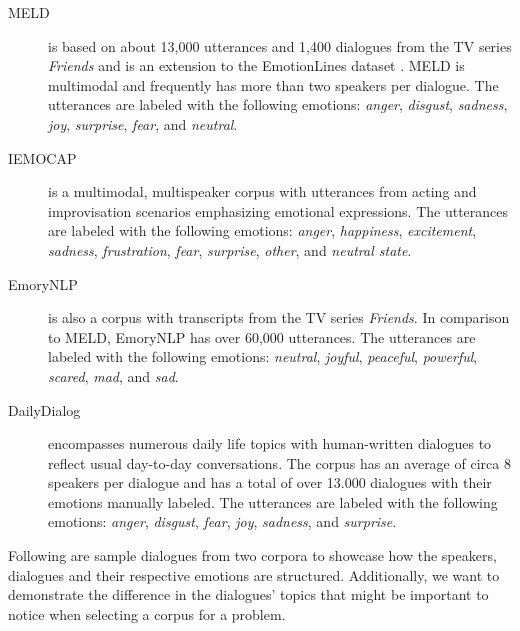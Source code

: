 \documentclass[nofilelist]{cslthse-msc}
\begin{document}
\begin{description}
    \item[MELD] \citep{poria2019meld} is based on about 13,000 utterances and 1,400 dialogues from the TV series \textit{Friends} and is an extension to the EmotionLines dataset \citep{chen2018emotionlines}. MELD is multimodal and  frequently has more than two speakers per dialogue. The utterances are labeled with the following emotions: \textit{anger}, \textit{disgust}, \textit{sadness}, \textit{joy}, \textit{surprise}, \textit{fear}, and \textit{neutral}.

    \item[IEMOCAP] \citep{busso2008iemocap} is a multimodal, multispeaker corpus with utterances from acting and improvisation scenarios emphasizing emotional expressions. The utterances are labeled with the following emotions: \textit{anger}, \textit{happiness}, \textit{excitement}, \textit{sadness}, \textit{frustration}, \textit{fear}, \textit{surprise}, \textit{other}, and \textit{neutral state}.
    
    \item[EmoryNLP] \citep{zahiri2017emoryNLP} is also a corpus with transcripts from the TV series \textit{Friends}. In comparison to MELD, EmoryNLP has over 60,000 utterances. The utterances are labeled with the following emotions: \textit{neutral}, \textit{joyful}, \textit{peaceful}, \textit{powerful}, \textit{scared}, \textit{mad}, and \textit{sad}.
    
    \item[DailyDialog] \citep{lietal2017dailydialog} encompasses numerous daily life topics with human-written dialogues to reflect usual day-to-day conversations. The corpus has an average of circa 8 speakers per dialogue and has a total of over 13.000 dialogues with their emotions manually labeled. The utterances are labeled with the following emotions: \textit{anger}, \textit{disgust}, \textit{fear}, \textit{joy}, \textit{sadness}, and \textit{surprise}.
\end{description}


Following are sample dialogues from two corpora to showcase how the speakers, dialogues and their respective emotions are structured. Additionally, we want to demonstrate the difference in the dialogues' topics that might be important to notice when selecting a corpus for a problem. 
\end{document}
